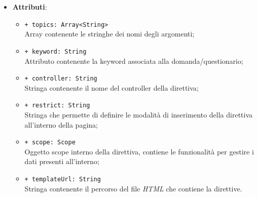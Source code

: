 \begin{itemize}
\begin{itemize}
	\end{itemize}
	\item \textbf{Attributi}:
	\begin{itemize}
		\item \texttt{+ topics: Array<String>} \\ Array contenente le stringhe dei nomi degli argomenti;
		\item \texttt{+ keyword: String} \\ Attributo contenente la keyword associata alla domanda/questionario;
		\item \texttt{+ controller: String} \\ Stringa contenente il nome del controller della direttiva;
		\item \texttt{+ restrict: String} \\ Stringa che permette di definire le modalità di inserimento della direttiva all'interno della pagina;
		\item \texttt{+ scope: Scope} \\ Oggetto scope interno della direttiva, contiene le funzionalità per gestire i dati presenti all'interno;
		\item \texttt{+ templateUrl: String} \\ Stringa contenente il percorso del file \textit{HTML} che contiene la direttive.
	\end{itemize}
\end{itemize}